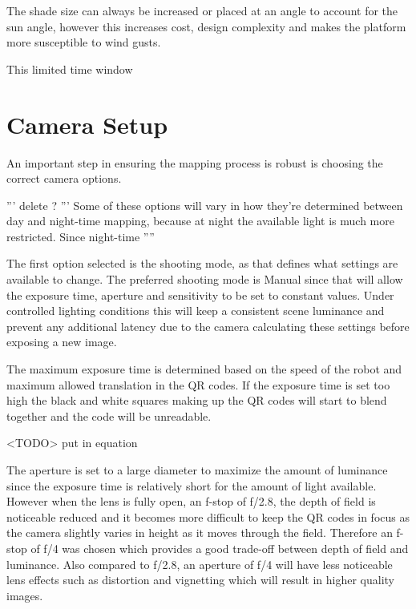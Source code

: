 The shade size can always be increased or placed at an angle to account for the sun angle, however this increases cost, design complexity and makes the platform more susceptible to wind gusts.  

This limited time window 








\section{Camera Setup}

An important step in ensuring the mapping process is robust is choosing the correct camera options. 

''' delete ? '''
 Some of these options will vary in how they're determined between day and night-time mapping, because at night the available light is much more restricted.  Since night-time 
''''

The first option selected is the shooting mode, as that defines what settings are available to change.  The preferred shooting mode is Manual since that will allow the exposure time, aperture and sensitivity to be set to constant values.  Under controlled lighting conditions this will keep a consistent scene luminance and prevent any additional latency due to the camera calculating these settings before exposing a new image.

The maximum exposure time is determined based on the speed of the robot and maximum allowed translation in the QR codes.  If the exposure time is set too high the black and white squares making up the QR codes will start to blend together and the code will be unreadable.  

<TODO> put in equation 

The aperture is set to a large diameter to maximize the amount of luminance since the exposure time is relatively short for the amount of light available.  However when the lens is fully open, an f-stop of f/2.8, the depth of field is noticeable reduced and it becomes more difficult to keep the QR codes in focus as the camera slightly varies in height as it moves through the field.  Therefore an f-stop of f/4 was chosen which provides a good trade-off between depth of field and luminance.  Also compared to f/2.8, an aperture of f/4 will have less noticeable lens effects such as distortion and vignetting which will result in higher quality images.  

